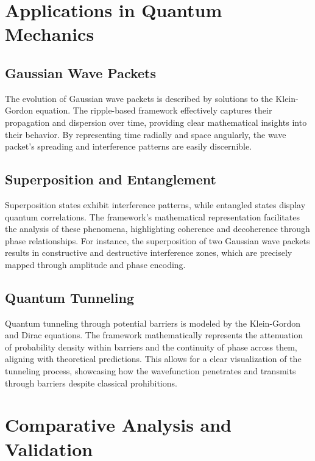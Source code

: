 \documentclass{article}
\begin{document}
\section{Applications in Quantum Mechanics}
\label{sec:applications_in_quantum_mechanics}

\subsection{Gaussian Wave Packets}

The evolution of Gaussian wave packets is described by solutions to the Klein-Gordon equation. The ripple-based framework effectively captures their propagation and dispersion over time, providing clear mathematical insights into their behavior. By representing time radially and space angularly, the wave packet's spreading and interference patterns are easily discernible.

\subsection{Superposition and Entanglement}

Superposition states exhibit interference patterns, while entangled states display quantum correlations. The framework's mathematical representation facilitates the analysis of these phenomena, highlighting coherence and decoherence through phase relationships. For instance, the superposition of two Gaussian wave packets results in constructive and destructive interference zones, which are precisely mapped through amplitude and phase encoding.

\subsection{Quantum Tunneling}

Quantum tunneling through potential barriers is modeled by the Klein-Gordon and Dirac equations. The framework mathematically represents the attenuation of probability density within barriers and the continuity of phase across them, aligning with theoretical predictions. This allows for a clear visualization of the tunneling process, showcasing how the wavefunction penetrates and transmits through barriers despite classical prohibitions.

\section{Comparative Analysis and Validation}
\label{sec:comparative_analysis_and_validation}
\end{document}
